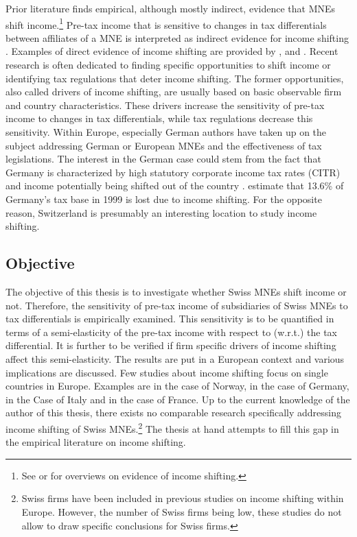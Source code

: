 \documentclass[10pt,twocolumn,oneside,cmyk]{article}
\begin{document}
Prior literature finds empirical, although mostly indirect, evidence that MNEs shift income.\footnote{See \textcite{dharmapala_what_2014} or \textcite{heckemeyer_multinationals_2013} for overviews on evidence of income shifting.} Pre-tax income that is sensitive to changes in tax differentials between affiliates of a MNE is interpreted as indirect evidence for income shifting \parencite[684]{mooij_corporate_2008}. Examples of direct evidence of income shifting are provided by \textcite[23-24]{vicard_profit_2015}, \textcite[1-2]{overesch_transfer_2006} and \textcite[2222]{clausing_tax-motivated_2003}. Recent research is often dedicated to finding specific opportunities to shift income or identifying tax regulations that deter income shifting. The former opportunities, also called drivers of income shifting, are usually based on basic observable firm and country characteristics. These drivers increase the sensitivity of pre-tax income to changes in tax differentials, while tax regulations decrease this sensitivity. Within Europe, especially German authors have taken up on the subject addressing German or European MNEs and the effectiveness of tax legislations. The interest in the German case could stem from the fact that Germany is characterized by high statutory corporate income tax rates (CITR) and income potentially being shifted out of the country \parencite[284, 293]{weichenrieder_profit_2009}. \textcite[1179]{huizinga_international_2008} estimate that 13.6\% of Germany's tax base in 1999 is lost due to income shifting. For the opposite reason, Switzerland is presumably an interesting location to study income shifting.

\subsection{Objective} \label{sec:Objective}
The objective of this thesis is to investigate whether Swiss MNEs shift income or not. Therefore, the sensitivity of pre-tax income of subsidiaries of Swiss MNEs to tax differentials is empirically examined. This sensitivity is to be quantified in terms of a semi-elasticity of the pre-tax income with respect to (w.r.t.) the tax differential. It is further to be verified if firm specific drivers of income shifting affect this semi-elasticity. The results are put in a European context and various implications are discussed. Few studies about income shifting focus on single countries in Europe. Examples are \textcite{langli_taxable_2004} in the case of Norway, \textcite{weichenrieder_profit_2009} in the case of Germany, \textcite{mura_challenging_2013} in the Case of Italy and \textcite{vicard_profit_2015} in the case of France. Up to the current knowledge of the author of this thesis, there exists no comparable research specifically addressing income shifting of Swiss MNEs.\footnote{Swiss firms have been included in previous studies on income shifting within Europe. However, the number of Swiss firms being low, these studies do not allow to draw specific conclusions for Swiss firms.} The thesis at hand attempts to fill this gap in the empirical literature on income shifting.
\end{document}
